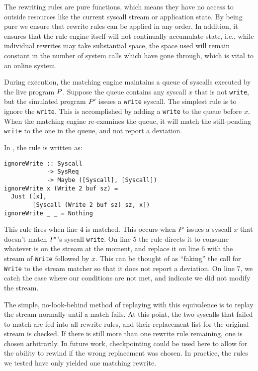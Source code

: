 The rewriting rules are pure functions, which means they have no
access to outside resources like the current syscall stream or
application state.  By being pure we ensure that rewrite rules can be
applied in any order.  In addition, it ensures that the rule engine
itself will not continually accumulate state, i.e., while individual
rewrites may take substantial space, the space used will remain
constant in the number of system calls which have gone through, which
is vital to an online system.


During execution, the matching engine maintains a queue of syscalls
executed by the live program $P$.  Suppose the queue contains
any syscall $x$ that is not \texttt{write}, but the simulated program
$P'$ issues a \texttt{write} syscall.  The simplest rule is to
ignore the \texttt{write}.  This is accomplished by adding a
\texttt{write} to the queue before $x$.  When the matching engine
re-examines the queue, it will match the still-pending \texttt{write} to the
one in the queue, and not report a deviation.

In \tachyon, the rule is written as:
\lstset{language=Haskell}
\begin{lstlisting}
ignoreWrite :: Syscall
            -> SysReq
            -> Maybe ([Syscall], [Syscall])
ignoreWrite x (Write 2 buf sz) =
  Just ([x],
        [Syscall (Write 2 buf sz) sz, x])
ignoreWrite _ _ = Nothing
\end{lstlisting}

This rule fires when line 4 is matched. This occurs when $P$
issues a syscall $x$ that doesn't match $P'$'s syscall
\texttt{write}. On line 5 the rule directs it to consume whatever is
on the stream at the moment, and replace it on line 6 with the stream
of \texttt{Write} followed by $x$. This can be thought of as
``faking'' the call for \texttt{Write} to the stream matcher so that
it does not report a deviation. On line
7, we catch the case where our conditions are not met, and
indicate we did not modify the stream.

The simple, no-look-behind method of replaying with this equivalence
is to replay the stream normally until a match fails. At this point,
the two syscalls that failed to match are fed into all rewrite rules,
and their replacement list for the original stream is checked. If
there is still more than one rewrite rule remaining, one is chosen
arbitrarily. In future work, checkpointing could be used here to allow
for the ability to rewind if the wrong replacement was chosen.  In
practice, the rules we tested have only yielded one matching rewrite.

